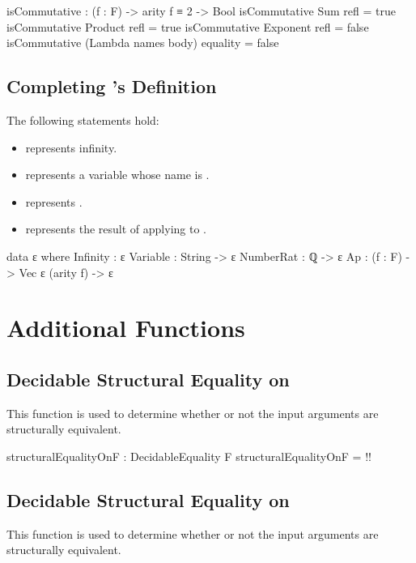 \documentclass{report}
\begin{document}
\begin{code}
isCommutative : (f : F) -> arity f ≡ 2 -> Bool
isCommutative Sum refl = true
isCommutative Product refl = true
isCommutative Exponent refl = false
isCommutative (Lambda names body) equality = false
\end{code}

\subsection{Completing 's Definition}
The following statements hold:

\begin{itemize}
  \item {} represents infinity.
  \item {}  represents a variable whose name is .
  \item {}  represents .
  \item {}   represents the result of applying  to .
\end{itemize}

\begin{code}
data ε where
  Infinity : ε
  Variable : String -> ε
  NumberRat : ℚ -> ε
  Ap : (f : F) -> Vec ε (arity f) -> ε
\end{code}

\section{Additional Functions}

\subsection{Decidable Structural Equality on }
This function is used to determine whether or not the input arguments are structurally equivalent.

\begin{code}
structuralEqualityOnF : DecidableEquality F
structuralEqualityOnF = {!!}
\end{code}

\subsection{Decidable Structural Equality on }
This function is used to determine whether or not the input arguments are structurally equivalent.
\end{document}
